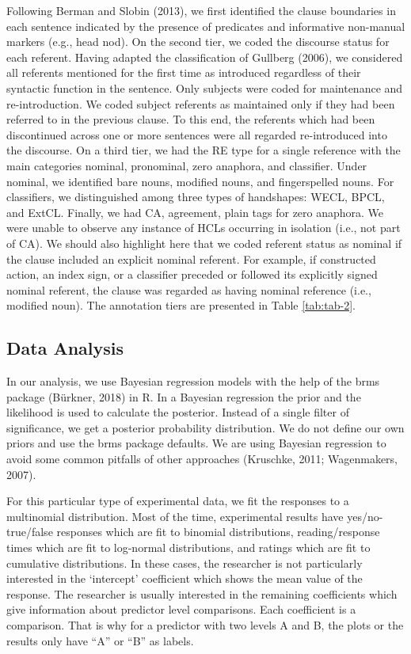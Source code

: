 \documentclass[]{elsarticle} %
\begin{document}
Following Berman and Slobin (2013), we first identified the clause
boundaries in each sentence indicated by the presence of predicates and
informative non-manual markers (e.g., head nod). On the second tier, we
coded the discourse status for each referent. Having adapted the
classification of Gullberg (2006), we considered all referents mentioned
for the first time as introduced regardless of their syntactic function
in the sentence. Only subjects were coded for maintenance and
re-introduction. We coded subject referents as maintained only if they
had been referred to in the previous clause. To this end, the referents
which had been discontinued across one or more sentences were all
regarded re-introduced into the discourse. On a third tier, we had the
RE type for a single reference with the main categories nominal,
pronominal, zero anaphora, and classifier. Under nominal, we identified
bare nouns, modified nouns, and fingerspelled nouns. For classifiers, we
distinguished among three types of handshapes: WECL, BPCL, and ExtCL.
Finally, we had CA, agreement, plain tags for zero anaphora. We were
unable to observe any instance of HCLs occurring in isolation (i.e., not
part of CA). We should also highlight here that we coded referent status
as nominal if the clause included an explicit nominal referent. For
example, if constructed action, an index sign, or a classifier preceded
or followed its explicitly signed nominal referent, the clause was
regarded as having nominal reference (i.e., modified noun). The
annotation tiers are presented in Table \ref{tab:tab-2}.

\hypertarget{data-analysis}{%
\subsection{Data Analysis}\label{data-analysis}}

In our analysis, we use Bayesian regression models with the help of the
brms package (Bürkner, 2018) in R. In a Bayesian regression the prior
and the likelihood is used to calculate the posterior. Instead of a
single filter of significance, we get a posterior probability
distribution. We do not define our own priors and use the brms package
defaults. We are using Bayesian regression to avoid some common pitfalls
of other approaches (Kruschke, 2011; Wagenmakers, 2007).

For this particular type of experimental data, we fit the responses to a
multinomial distribution. Most of the time, experimental results have
yes/no-true/false responses which are fit to binomial distributions,
reading/response times which are fit to log-normal distributions, and
ratings which are fit to cumulative distributions. In these cases, the
researcher is not particularly interested in the `intercept' coefficient
which shows the mean value of the response. The researcher is usually
interested in the remaining coefficients which give information about
predictor level comparisons. Each coefficient is a comparison. That is
why for a predictor with two levels A and B, the plots or the results
only have ``A'' or ``B'' as labels.
\end{document}
